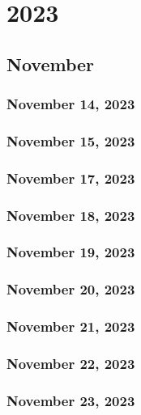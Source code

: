\part{2023}
\chapter{November}
\section{November 14, 2023}


\section{November 15, 2023}


\section{November 17, 2023}


\section{November 18, 2023}


\section{November 19, 2023}


\section{November 20, 2023}


\section{November 21, 2023}



\section{November 22, 2023}



\section{November 23, 2023}

